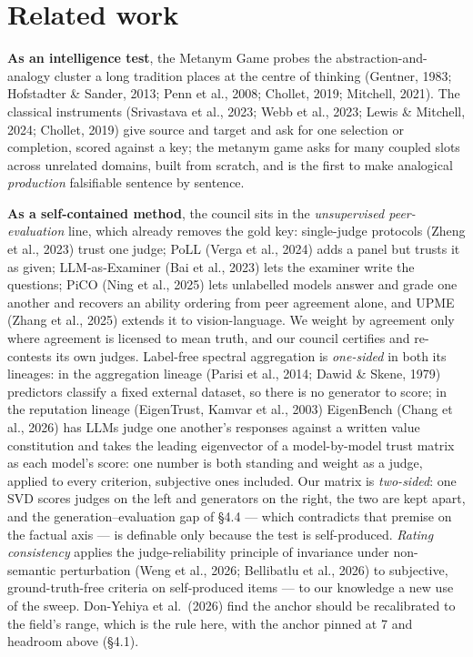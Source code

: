 \documentclass{article}
\begin{document}
\section{Related work}\label{related-work}

\textbf{As an intelligence test}, the Metanym Game probes the abstraction-and-analogy cluster a long tradition places at the centre of thinking (Gentner, 1983; Hofstadter \& Sander, 2013; Penn et al., 2008; Chollet, 2019; Mitchell, 2021). The classical instruments (Srivastava et al., 2023; Webb et al., 2023; Lewis \& Mitchell, 2024; Chollet, 2019) give source and target and ask for one selection or completion, scored against a key; the metanym game asks for many coupled slots across unrelated domains, built from scratch, and is the first to make analogical \emph{production} falsifiable sentence by sentence.

\textbf{As a self-contained method}, the council sits in the \emph{unsupervised peer-evaluation} line, which already removes the gold key: single-judge protocols (Zheng et al., 2023) trust one judge; PoLL (Verga et al., 2024) adds a panel but trusts it as given; LLM-as-Examiner (Bai et al., 2023) lets the examiner write the questions; PiCO (Ning et al., 2025) lets unlabelled models answer and grade one another and recovers an ability ordering from peer agreement alone, and UPME (Zhang et al., 2025) extends it to vision-language. We weight by agreement only where agreement is licensed to mean truth, and our council certifies and re-contests its own judges. Label-free spectral aggregation is \emph{one-sided} in both its lineages: in the aggregation lineage (Parisi et al., 2014; Dawid \& Skene, 1979) predictors classify a fixed external dataset, so there is no generator to score; in the reputation lineage (EigenTrust, Kamvar et al., 2003) EigenBench (Chang et al., 2026) has LLMs judge one another's responses against a written value constitution and takes the leading eigenvector of a model-by-model trust matrix as each model's score: one number is both standing and weight as a judge, applied to every criterion, subjective ones included. Our matrix is \emph{two-sided}: one SVD scores judges on the left and generators on the right, the two are kept apart, and the generation--evaluation gap of \S{}4.4 --- which contradicts that premise on the factual axis --- is definable only because the test is self-produced. \emph{Rating consistency} applies the judge-reliability principle of invariance under non-semantic perturbation (Weng et al., 2026; Bellibatlu et al., 2026) to subjective, ground-truth-free criteria on self-produced items --- to our knowledge a new use of the sweep. Don-Yehiya et al.~(2026) find the anchor should be recalibrated to the field's range, which is the rule here, with the anchor pinned at 7 and headroom above (\S{}4.1).
\end{document}
